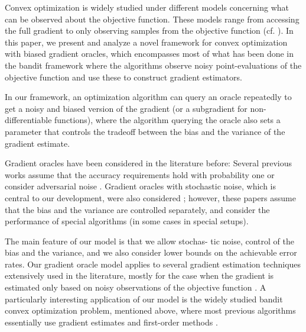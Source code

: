 Convex optimization is widely studied under different models concerning what can be observed about the objective function. 
These models range from accessing the full gradient to only observing samples from the objective function (cf. \citealp{nesterov2004introductory,DeGliNe14,HaLe14:SOC,PoTsy90,flaxman2005online,AbHaRa08,AgDeXi10,Ne11:TR,AgFoHsuKaRa13:SIAM,katkul,kushcla,spall1992multivariate,spall1997one,Dip03:AoS,bhatnagar-book,duchi2015optimal}). In this paper, we present and analyze a novel framework for convex optimization with biased gradient oracles, which encompasses most of what has been done in the bandit framework where the algorithms observe noisy point-evaluations of the objective function and use these to construct gradient estimators.

In our framework, an optimization algorithm can query an oracle repeatedly to get a noisy and biased version of the gradient (or a subgradient for non-differentiable functions), where the algorithm querying the oracle also sets a parameter that controls the tradeoff between the bias and the variance of the gradient estimate.

Gradient oracles have been considered in the literature before: Several previous works assume that the accuracy requirements hold with probability one \citep{dAsp08,Baes09,DeGliNe14} or consider adversarial noise \citep{SchRoBa11}. Gradient oracles with stochastic noise, which is central to our development, were also considered \citep{JN11a,Hon12,DvoGa15}; however, these papers assume that the bias and the variance are controlled separately, and consider the performance of special algorithms (in some cases in special setups).

The main feature of our model is that we allow stochas- tic noise, control of the bias and the variance, and we also consider lower bounds on the achievable error rates. Our gradient oracle model applies to several gradient estimation techniques extensively used in the literature, mostly for the case when the gradient is estimated only based on noisy observations of the objective function \citep{katkul,kushcla,spall1992multivariate,spall1997one,Dip03:AoS,bhatnagar-book,duchi2015optimal}. A particularly interesting application of our model is the widely studied bandit convex optimization problem,
mentioned above,
where most previous algorithms 
essentially use gradient estimates and first-order methods 
\citep{PoTsy90,flaxman2005online,AbHaRa08,AgDeXi10,Ne11:TR,AgFoHsuKaRa13:SIAM,HaLe14:SOC}.

